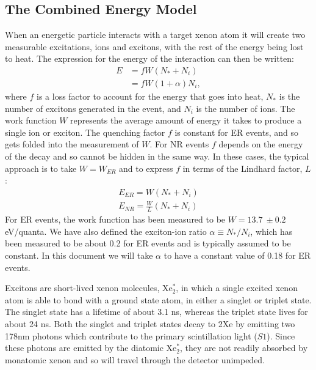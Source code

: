 \subsection{The Combined Energy Model}\label{sec:combE}
When an energetic particle interacts with a target xenon atom it will create two measurable excitations, ions and excitons, with the rest of the energy being lost to heat. The expression for the energy of the interaction can then be written:
\begin{equation}\label{eq:combe1}
\begin{split}
E&=fW(N_*+N_i)\\
&=fW(1+\alpha)N_i,
\end{split}
\end{equation}
where $f$ is a loss factor to account for the energy that goes into heat, $N_*$ is the number of excitons generated in the event, and $N_i$ is the number of ions. The work function $W$ represents the average amount of energy it takes to produce a single ion or exciton. The quenching factor $f$ is constant for ER events, and so gets folded into the measurement of $W$. For NR events $f$ depends on the energy of the decay and so cannot be hidden in the same way. In these cases, the typical approach is to take $W=W_{ER}$ and to express $f$ in terms of the Lindhard factor, $L$\cite{lindhard}:
\begin{equation}
\begin{split}
E_{ER}=W(N_*+N_i)\\[1em]
E_{NR}=\frac{W}{L}(N_*+N_i)
\end{split}
\end{equation}
For ER events, the work function has been measured to be $W=13.7 \ \pm0.2$ eV/quanta\cite{dahl}. We have also defined the exciton-ion ratio $\alpha \equiv N_{*}/N_{i}$, which has been measured to be about 0.2\cite{doke2002,attila} for ER events and is typically assumed to be constant. In this document we will take $\alpha$ to have a constant value of 0.18 for ER events. 

Excitons are short-lived xenon molecules, Xe$_2^*$, in which a single excited xenon atom is able to bond with a ground state atom, in either a singlet or triplet state. The singlet state has a lifetime of about 3.1 ns, whereas the triplet state lives for about 24 ns\cite{pulseshape}. Both the singlet and triplet states decay to 2Xe by emitting two 178nm photons which contribute to the primary scintillation light ($S1$). Since these photons are emitted by the diatomic Xe$_2^*$, they are not readily absorbed by monatomic xenon and so will travel through the detector unimpeded. 

